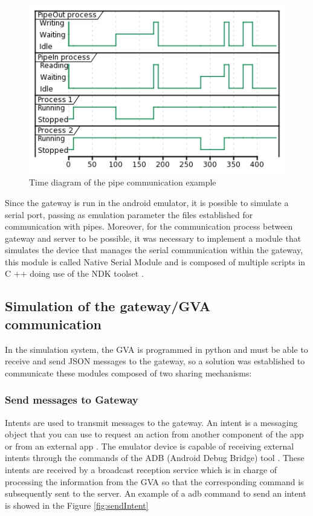 \documentclass[journal]{IEEEtran}	%
\begin{document}
\begin{figure}[t]
\centering
\includegraphics[width=0.95\columnwidth]{pipe.png}
\caption{Time diagram of the pipe communication example}
\label{fig:pipe}
\end{figure}

Since the gateway is run in the android emulator, it is possible to simulate a serial port, passing as emulation parameter the files established for communication with pipes. Moreover, for the communication process between gateway and server to be possible, it was necessary to implement a module that simulates the device that manages the serial communication within the gateway, this module is called Native Serial Module and is composed of multiple scripts in C ++ doing use of the NDK toolset \cite{NDK}.

\subsection{Simulation of the gateway/GVA communication}
\label{sec:Gateway-GVA}
In the simulation system, the GVA is programmed in python and must be able to receive and send JSON messages to the gateway, so a solution was established to communicate these modules composed of two sharing mechanisms:

\subsubsection{Send messages to Gateway}
Intents are used to transmit messages to the gateway. An intent is a messaging object that you can use to request an action from another component of the app or from an external app \cite{Intents}. The emulator device is capable of receiving external intents through the commands of the ADB (Android Debug Bridge) tool \cite{ADB}. These intents are received by a broadcast reception service which is in charge of processing the information from the GVA so that the corresponding command is subsequently sent to the server. An example of a adb command to send an intent is showed in the Figure \ref{fig:sendIntent}
\end{document}
